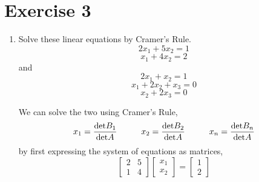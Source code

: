 \section{Exercise 3}
\begin{enumerate}
    \item Solve these linear equations by Cramer's Rule.
    \begin{equation}
        2x_{1} + 5x_{2} = 1
    \end{equation}
    \begin{equation}
        x_{1} + 4x_{2} = 2
    \end{equation}
    and 
    \begin{equation}
        2x_{1} +x_{2} =1
    \end{equation}
    \begin{equation}
        x_{1} + 2x_{2} + x_{3} = 0
    \end{equation}
    \begin{equation}
        x_{2} + 2x_{3} = 0
    \end{equation}
        \begin{mdframed}[style=MyFrame]
            We can solve the two using Cramer's Rule,
            \begin{equation}
                x_{1} = \frac{\text{det}B_{1}}{\text{det}A}
                \hspace{1.0cm}
                x_{2} = \frac{\text{det}B_{2}}{\text{det}A}
                \hspace{1.0cm}
                x_{n} = \frac{\text{det}B_{n}}{\text{det}A}
            \end{equation}
            by first expressing the system of equations as matrices,
            \begin{equation}
                \begin{bmatrix}
                    2       &       5       \\
                    1       &       4
                \end{bmatrix}
                \begin{bmatrix}
                    x_{1}   \\
                    x_{2}
                \end{bmatrix}
                =
                \begin{bmatrix}
                    1   \\
                    2
                \end{bmatrix}
            \end{equation}

\end{mdframed}
\end{enumerate}
